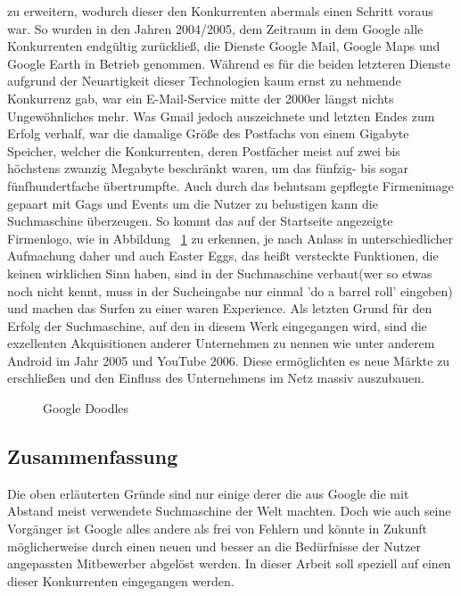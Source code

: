 zu erweitern, wodurch dieser den Konkurrenten abermals einen Schritt voraus war.
So wurden in den Jahren 2004/2005, dem Zeitraum in dem Google alle Konkurrenten endgültig zurückließ, die Dienste Google Mail,
Google Maps und Google Earth in Betrieb genommen.
Während es für die beiden letzteren Dienste aufgrund der Neuartigkeit dieser Technologien kaum ernst zu nehmende
Konkurrenz gab, war ein E-Mail-Service mitte der 2000er längst nichts Ungewöhnliches mehr.
Was Gmail jedoch auszeichnete und letzten Endes zum Erfolg verhalf, war die damalige Größe des Postfachs von einem
Gigabyte Speicher, welcher die Konkurrenten, deren Postfächer meist auf zwei bis höchstens zwanzig Megabyte beschränkt
waren, um das fünfzig- bis sogar fünfhundertfache übertrumpfte.
Auch durch das behutsam gepflegte Firmenimage gepaart mit Gags und Events um die Nutzer zu belustigen kann
die Suchmaschine überzeugen.
So kommt das auf der Startseite angezeigte Firmenlogo, wie in Abbildung ~\ref{google_doodle} zu erkennen, je nach Anlass in
unterschiedlicher Aufmachung daher und auch Easter Eggs, das heißt versteckte Funktionen, die keinen wirklichen Sinn haben,
sind in der Suchmaschine verbaut(wer so etwas noch nicht kennt, muss in der Sucheingabe nur einmal 'do a barrel roll' eingeben)
und machen das Surfen zu einer waren Experience.
Als letzten Grund für den Erfolg der Suchmaschine, auf den in diesem Werk eingegangen wird, sind die exzellenten
Akquisitionen anderer Unternehmen zu nennen wie unter anderem Android im Jahr 2005 und YouTube 2006.
Diese ermöglichten es neue Märkte zu erschließen und den Einfluss des Unternehmens im Netz massiv auszubauen.

\begin{figure}[h]
    \centering
    \caption{Google Doodles}\label{google_doodle}
\end{figure}

\subsection{Zusammenfassung}\label{subsec:zusammenfassung}
Die oben erläuterten Gründe sind nur einige derer die aus Google die mit Abstand meist verwendete Suchmaschine der Welt
machten.
Doch wie auch seine Vorgänger ist Google alles andere als frei von Fehlern und könnte in Zukunft möglicherweise durch einen
neuen und besser an die Bedürfnisse der Nutzer angepassten Mitbewerber abgelöst werden.
In dieser Arbeit soll speziell auf einen dieser Konkurrenten eingegangen werden.